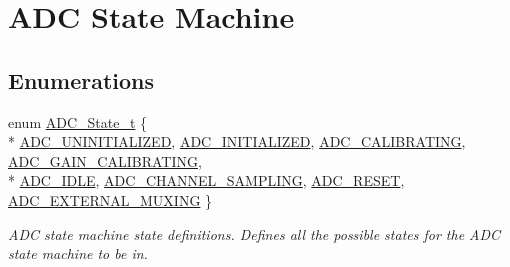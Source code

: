 \hypertarget{group__adc__statemachine}{\section{A\-D\-C State Machine}
\label{group__adc__statemachine}
}
\subsection*{Enumerations}
\begin{DoxyCompactItemize}
\item 
enum \hyperlink{group__adc__statemachine_gae8acd7c093ba943ff020756662d8e282}{A\-D\-C\-\_\-\-State\-\_\-t} \{ \\*
\hyperlink{group__adc__statemachine_ggae8acd7c093ba943ff020756662d8e282ac1bd0f71a88c6a0448812f5c9bfabc82}{A\-D\-C\-\_\-\-U\-N\-I\-N\-I\-T\-I\-A\-L\-I\-Z\-E\-D}, 
\hyperlink{group__adc__statemachine_ggae8acd7c093ba943ff020756662d8e282a3dd35159e362e102ff3857defd2ee5ec}{A\-D\-C\-\_\-\-I\-N\-I\-T\-I\-A\-L\-I\-Z\-E\-D}, 
\hyperlink{group__adc__statemachine_ggae8acd7c093ba943ff020756662d8e282ad44134e74eaafda748b36b62b64b3ffb}{A\-D\-C\-\_\-\-C\-A\-L\-I\-B\-R\-A\-T\-I\-N\-G}, 
\hyperlink{group__adc__statemachine_ggae8acd7c093ba943ff020756662d8e282a1ce1ead9375dee706ff6e8df4012e845}{A\-D\-C\-\_\-\-G\-A\-I\-N\-\_\-\-C\-A\-L\-I\-B\-R\-A\-T\-I\-N\-G}, 
\\*
\hyperlink{group__adc__statemachine_ggae8acd7c093ba943ff020756662d8e282aa37cde1dabf7658cc9bb359dc7ad7ce8}{A\-D\-C\-\_\-\-I\-D\-L\-E}, 
\hyperlink{group__adc__statemachine_ggae8acd7c093ba943ff020756662d8e282ac39ce4086e8ea9dbbbe721d237b0e58d}{A\-D\-C\-\_\-\-C\-H\-A\-N\-N\-E\-L\-\_\-\-S\-A\-M\-P\-L\-I\-N\-G}, 
\hyperlink{group__adc__statemachine_ggae8acd7c093ba943ff020756662d8e282a49f30e17bd4e0529efe8855e9dc163bc}{A\-D\-C\-\_\-\-R\-E\-S\-E\-T}, 
\hyperlink{group__adc__statemachine_ggae8acd7c093ba943ff020756662d8e282a09bb7081acebf276c0dd4ada41696612}{A\-D\-C\-\_\-\-E\-X\-T\-E\-R\-N\-A\-L\-\_\-\-M\-U\-X\-I\-N\-G}
 \}
\begin{DoxyCompactList}\small\item\em A\-D\-C state machine state definitions. Defines all the possible states for the A\-D\-C state machine to be in. \end{DoxyCompactList}\end{DoxyCompactItemize}
